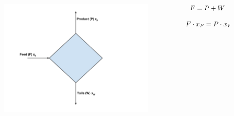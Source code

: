 \documentclass[aspectratio=1610,pdftex,dvipsnames,compress,xcolor={dvipsnames}]{beamer}
\begin{document}
\begin{frame}{}
    \begin{columns}[c]

        \begin{column}{0.55\textwidth}
            \begin{figure}
                \centering
                \includegraphics[width=0.95\textwidth]{mass.conservation.jpg}
            \end{figure}
        \end{column}

        \begin{column}{0.45\textwidth}
            \begin{equation}
                \LARGE 
                F = P + W
            \end{equation}

            \begin{equation}
                \LARGE 
                F \cdot x_F = P \cdot x_P + W \cdot x_W
            \end{equation}
        \end{column}

    \end{columns}
\end{frame}
\end{document}
